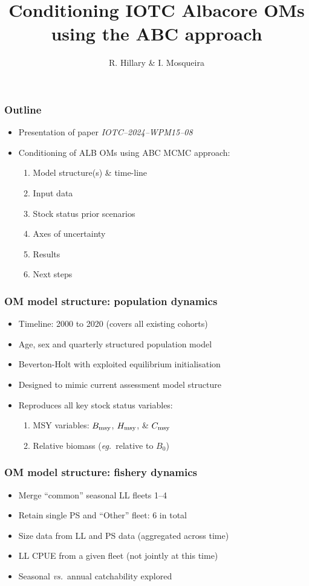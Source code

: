 \documentclass{beamer}
\title{Conditioning IOTC Albacore OMs using the ABC approach}
\author{R. Hillary \& I. Mosqueira}
\institute{CSIRO Environment (AU) \& Wageningen Marine Research (NL)}
\newcommand{\bmsy}{B_{\rm msy}}
\newcommand{\cmsy}{C_{\rm msy}}
\newcommand{\hmsy}{H_{\rm msy}}
\newcommand{\vs}{\textit{vs.}~}
\newcommand{\eg}{\textit{eg.}~}
\begin{document}
\maketitle

\begin{frame}
\frametitle{Outline}
\begin{itemize}
    \item Presentation of paper \textit{IOTC--2024--WPM15--08}
    \item Conditioning of ALB OMs using ABC MCMC approach:
        \vspace{0.25cm} 
        \begin{enumerate}
            \item Model structure(s) \& time-line
            \item Input data
            \item Stock status prior scenarios
            \item Axes of uncertainty
            \item Results
            \item Next steps
        \end{enumerate}
\end{itemize}
\end{frame}

\begin{frame}
\frametitle{OM model structure: population dynamics}
\begin{itemize}
    \item Timeline: 2000 to 2020 (covers all existing cohorts)
    \item Age, sex and quarterly structured population model
    \item Beverton-Holt with exploited equilibrium initialisation
    \item Designed to mimic current assessment model structure
    \item Reproduces all key stock status variables:
        \vspace{0.25cm}
        \begin{enumerate}
            \item MSY variables: $\bmsy$, $\hmsy$, \& $\cmsy$
            \item Relative biomass (\eg relative to $B_0$)
        \end{enumerate}
\end{itemize}
\end{frame}

\begin{frame}
\frametitle{OM model structure: fishery dynamics}
\begin{itemize}
    \item Merge ``common'' seasonal LL fleets 1--4
    \item Retain single PS and ``Other'' fleet: 6 in total
    \item Size data from LL and PS data (aggregated across time)
    \item LL CPUE from a given fleet (not jointly at this time)
    \item Seasonal \vs annual catchability explored
\end{itemize}
\end{frame}
\end{document}
